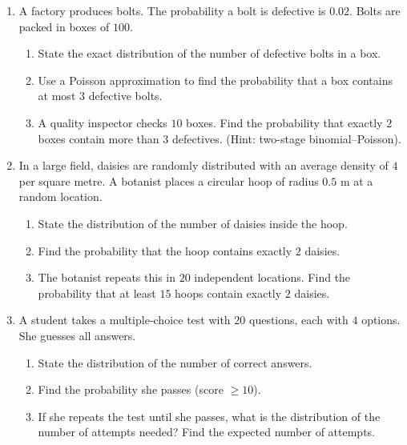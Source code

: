 \documentclass[11pt]{article}
\begin{document}
\begin{exercice}
\begin{enumerate}
    \item A factory produces bolts. The probability a bolt is defective is $0.02$. Bolts are packed in boxes of $100$.
    \begin{enumerate}
        \item State the exact distribution of the number of defective bolts in a box.
        \item Use a Poisson approximation to find the probability that a box contains at most $3$ defective bolts.
        \item A quality inspector checks $10$ boxes. Find the probability that exactly $2$ boxes contain more than $3$ defectives. (Hint: two-stage binomial--Poisson).
    \end{enumerate}
    \item In a large field, daisies are randomly distributed with an average density of $4$ per square metre. A botanist places a circular hoop of radius $0.5$ m at a random location.
    \begin{enumerate}
        \item State the distribution of the number of daisies inside the hoop.
        \item Find the probability that the hoop contains exactly $2$ daisies.
        \item The botanist repeats this in $20$ independent locations. Find the probability that at least $15$ hoops contain exactly $2$ daisies.
    \end{enumerate}
    \item A student takes a multiple-choice test with $20$ questions, each with $4$ options. She guesses all answers.
    \begin{enumerate}
        \item State the distribution of the number of correct answers.
        \item Find the probability she passes (score $\ge 10$).
        \item If she repeats the test until she passes, what is the distribution of the number of attempts needed? Find the expected number of attempts.
    \end{enumerate}
\end{enumerate}
\end{exercice}
\end{document}
